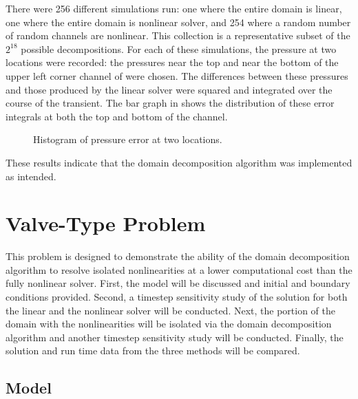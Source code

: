 There were 256 different simulations run: one where the entire domain is linear, one where the entire domain is nonlinear solver, and 254 where a random number of random channels are nonlinear.
This collection is a representative subset of the $2^{18}$ possible decompositions.
For each of these simulations, the pressure at two locations were recorded: the pressures near the top and near the bottom of the upper left corner channel of  were chosen.
The differences between these pressures and those produced by the linear solver were squared and integrated over the course of the transient.
The bar graph in  shows the distribution of these error integrals at both the top and bottom of the channel.

\begin{figure}[h!tb]
\centering

\caption{Histogram of pressure error at two locations.}
\label{fig:complexBar}
\end{figure}

These results indicate that the domain decomposition algorithm was implemented as intended.

\section{Valve-Type Problem}
\label{sect:valveProblem}

This problem is designed to demonstrate the ability of the domain decomposition algorithm to resolve isolated nonlinearities at a lower computational cost than the fully nonlinear solver. 
First, the model will be discussed and initial and boundary conditions provided.
Second, a timestep sensitivity study of the solution for both the linear and the nonlinear solver will be conducted.
Next, the portion of the domain with the nonlinearities will be isolated via the domain decomposition algorithm and another timestep sensitivity study will be conducted.
Finally, the solution and run time data from the three methods will be compared.

\subsection{Model}
\label{subsect:valveModel}

